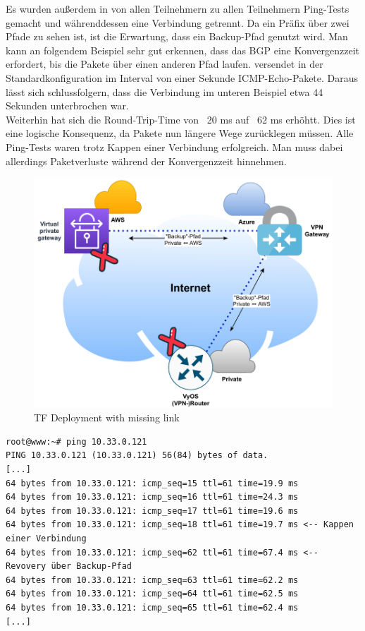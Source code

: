 
Es wurden außerdem in von allen Teilnehmern zu allen Teilnehmern Ping-Tests gemacht und währenddessen eine Verbindung getrennt. Da ein Präfix über zwei Pfade zu sehen ist, ist die Erwartung, dass ein Backup-Pfad genutzt wird. Man kann an folgendem Beispiel sehr gut erkennen, dass das BGP eine Konvergenzzeit erfordert, bis die Pakete über einen anderen Pfad laufen.  versendet in der Standardkonfiguration im Interval von einer Sekunde ICMP-Echo-Pakete. Daraus lässt sich schlussfolgern, dass die Verbindung im unteren Beispiel etwa 44 Sekunden unterbrochen war. \\
Weiterhin hat sich die Round-Trip-Time von ~20 ms auf ~62 ms erhöhtt. Dies ist eine logische Konsequenz, da Pakete nun längere Wege zurücklegen müssen. Alle Ping-Tests waren trotz Kappen einer Verbindung erfolgreich. Man muss dabei allerdings Paketverluste während der Konvergenzzeit hinnehmen.

\begin{figure}[h]
  \centering
  \includegraphics{Figures/Use-Case-1_Basis_Deployment_missing_link.pdf}
  \caption{TF Deployment with missing link}
  \label{grafik:Use-Case-1_Basis_Deployment_missing_link}
\end{figure}

\begin{lstlisting}[label=tf-base-deployment-ping-ok,caption=Ping Tests zwischen verschiedenen Cloud-Plattformen mit Kappen einer Backbone-Verbindung.]
root@www:~# ping 10.33.0.121
PING 10.33.0.121 (10.33.0.121) 56(84) bytes of data.
[...]
64 bytes from 10.33.0.121: icmp_seq=15 ttl=61 time=19.9 ms
64 bytes from 10.33.0.121: icmp_seq=16 ttl=61 time=24.3 ms
64 bytes from 10.33.0.121: icmp_seq=17 ttl=61 time=19.6 ms
64 bytes from 10.33.0.121: icmp_seq=18 ttl=61 time=19.7 ms <-- Kappen einer Verbindung
64 bytes from 10.33.0.121: icmp_seq=62 ttl=61 time=67.4 ms <-- Revovery über Backup-Pfad
64 bytes from 10.33.0.121: icmp_seq=63 ttl=61 time=62.2 ms
64 bytes from 10.33.0.121: icmp_seq=64 ttl=61 time=62.5 ms
64 bytes from 10.33.0.121: icmp_seq=65 ttl=61 time=62.4 ms
[...]
\end{lstlisting}

